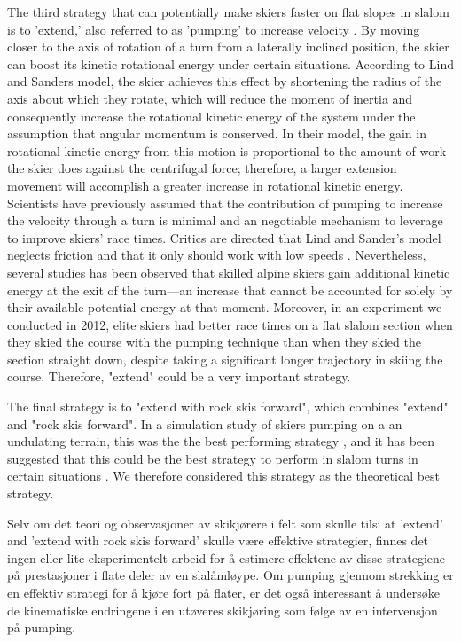 The third strategy that can potentially make skiers faster on flat slopes in slalom is to 'extend,' also referred to as 'pumping' to increase velocity \cite{lind_physics_2013}. By moving closer to the axis of rotation of a turn from a laterally inclined position, the skier can boost its kinetic rotational energy under certain situations. According to Lind and Sanders \cite{lind_physics_2013} model, the skier achieves this effect by shortening the radius of the axis about which they rotate, which will reduce the moment of inertia and consequently increase the rotational kinetic energy of the system under the assumption that angular momentum is conserved. In their model, the gain in rotational kinetic energy from this motion is proportional to the amount of work the skier does against the centrifugal force; therefore, a larger extension movement will accomplish a greater increase in rotational kinetic energy. Scientists have previously assumed that the contribution of pumping to increase the velocity through a turn is minimal and an negotiable mechanism to leverage to improve skiers' race times\cite{supej_differential_2008}. Critics are directed that Lind and Sander's model neglects friction and that it only should work with low speeds \cite{supej_differential_2008, supej_how_2010}. Nevertheless, several studies has been observed that skilled alpine skiers gain additional kinetic energy at the exit of the turn—an increase that cannot be accounted for solely by their available potential energy at that moment\cite{reid_kinematic_2010, supej_how_2010, supej_differential_2008}. Moreover, in an experiment we conducted in 2012, elite skiers had better race times on a flat slalom section when they skied the course with the pumping technique than when they skied the section straight down, despite taking a significant longer trajectory in skiing the course. Therefore, "extend" could be a very important strategy.  

The final strategy is to "extend with rock skis forward", which combines "extend" and "rock skis forward". In a simulation study of skiers pumping on a an undulating terrain, this was the the best performing strategy \cite{mote_accelerations_1983}, and it has been suggested that this could be the best strategy to perform in slalom turns in certain situations \cite{reid_kinematic_2010}. We therefore considered this strategy as the theoretical best strategy. 

Selv om det teori og observasjoner av skikjørere i felt som skulle tilsi at 'extend' and 'extend with rock skis forward' skulle være effektive strategier, finnes det ingen eller lite eksperimentelt arbeid for å estimere effektene av disse strategiene på prestasjoner i flate deler av en slalåmløype. Om pumping gjennom strekking er en effektiv strategi for å kjøre fort på flater, er det også interessant å undersøke de kinematiske endringene i en utøveres skikjøring som følge av en intervensjon på pumping. 


